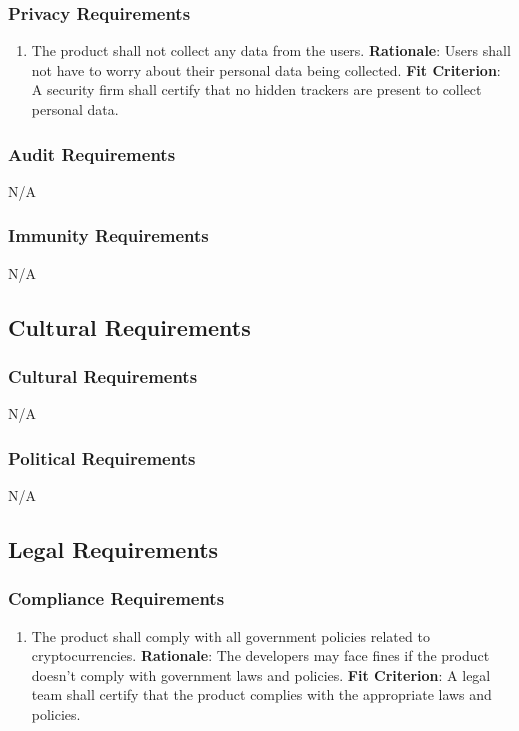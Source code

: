 \documentclass[12pt, titlepage]{article}
\begin{document}
\subsubsection{Privacy Requirements}
\begin{enumerate}[nfr]
    \item The product shall not collect any data from the users.
    \newline \textbf{Rationale}: Users shall not have to worry about their personal data being collected. 
    \newline \textbf{Fit Criterion}: A security firm shall certify that no hidden trackers are present to collect personal data.
\end{enumerate}

\subsubsection{Audit Requirements}
N/A

\subsubsection{Immunity Requirements}
N/A

\subsection{Cultural Requirements}
\subsubsection{Cultural Requirements}
N/A
\subsubsection{Political Requirements}
N/A

\subsection{Legal Requirements}
\subsubsection{Compliance Requirements}
\begin{enumerate}[nfr]
\item The product shall comply with all government policies related to cryptocurrencies.
\newline \textbf{Rationale}: The developers may face fines if the product doesn't comply with government laws and policies.
\newline \textbf{Fit Criterion}: A legal team shall certify that the product complies with the appropriate laws and policies.
\end{enumerate}
\end{document}
